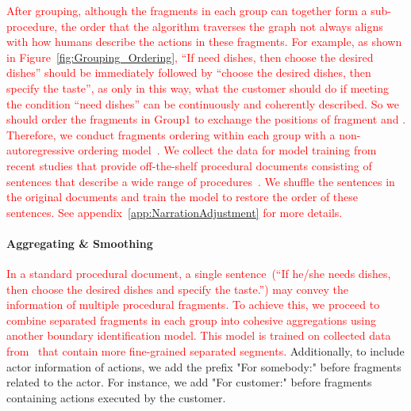 
\textcolor{red}{
After grouping, although the fragments in each group can together form a sub-procedure, the order that the algorithm traverses the graph not always aligns with how humans describe the actions in these fragments. 
For example, as shown in Figure~\ref{fig:Grouping_Ordering}, ``If need dishes, then choose the desired dishes'' should be immediately followed by ``choose the desired dishes, then specify the taste'', as only in this way, what the customer should do if meeting the condition ``need dishes'' can be continuously and coherently described. So we should order the fragments in Group1 to exchange the positions of fragment  and . 
Therefore, we conduct fragments ordering within each group with a non-autoregressive ordering model~\cite{bin2023non}. 
We collect the data for model training from recent studies that provide off-the-shelf procedural documents consisting of sentences that describe a wide range of procedures~\cite{sakaguchi2021proscript, nandy2021question, bolotova2023wikihowqa}. We shuffle the sentences in the original documents and train the model to restore the order of these sentences. 
See appendix~\ref{app:NarrationAdjustment} for more details.}

\paragraph{Aggregating \& Smoothing}
\textcolor{red}{
In a standard procedural document, a single sentence~(``If he/she needs dishes, then choose the desired dishes and specify the taste.'') may convey the information of multiple procedural fragments. To achieve this, we proceed to combine separated fragments in each group into cohesive aggregations using another boundary identification model. This model is trained on collected data from~\citet{castelli2020techqa, zhang-etal-2020-reasoning, lyu2021goal} that contain more fine-grained separated segments. 
}
Additionally, to include actor information of actions, we add the prefix "For somebody:" before fragments related to the actor. For instance, we add "For customer:" before fragments containing actions executed by the customer. 

